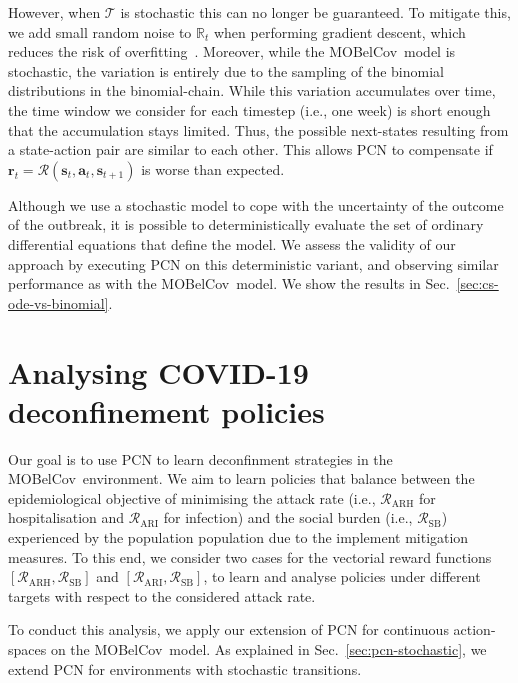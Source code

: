 \documentclass{article}
\renewcommand{\cite}[1]{\citep{#1}}
\newcommand{\mdptransition}{\mathcal{T}}
\newcommand{\mdprewardfn}{\mathcal{R}}
\newcommand{\momdprewardfn}{\bm{\mathcal{R}}}
\newcommand{\mdpstate}{\mathbf{s}}
\newcommand{\momdpreward}{\mathbf{r}}
\newcommand{\mdpaction}{\mathbf{a}}
\newcommand{\momdpname}{MOBelCov}
\begin{document}
However, when $\mdptransition$ is stochastic this can no longer be guaranteed. To mitigate this, we add small random noise to $\mathbb{R}_t$ when performing gradient descent, which reduces the risk of overfitting~\cite{zur2009noise}. Moreover, while the \momdpname\ model is stochastic, the variation is entirely due to the sampling of the binomial distributions in the binomial-chain. While this variation accumulates over time, the time window we consider for each timestep (i.e., one week) is short enough that the accumulation stays limited. Thus, the possible next-states resulting from a state-action pair are similar to each other. This allows PCN to compensate if $\momdpreward_t = \momdprewardfn(\mdpstate_t, \mdpaction_t, \mdpstate_{t+1})$ is worse than expected.

Although we use a stochastic model to cope with the uncertainty of the outcome of the outbreak, it is possible to deterministically evaluate the set of ordinary differential equations that define the model. We assess the validity of our approach by executing PCN on this deterministic variant, and observing similar performance as with the \momdpname\ model. We show the results in Sec.~\ref{sec:cs-ode-vs-binomial}.

\section{Analysing COVID-19 deconfinement policies}
\label{sec:experiments}
Our goal is to use PCN to learn deconfinment strategies in the \momdpname\ environment. We aim to learn policies that balance between the epidemiological objective of minimising the attack rate (i.e., $\mdprewardfn_\text{ARH}$ for hospitalisation and $\mdprewardfn_\text{ARI}$ for infection) and the social burden (i.e., $\mdprewardfn_\text{SB}$) experienced by the population population due to the implement mitigation measures. To this end, we consider two cases for the vectorial reward functions $[\mdprewardfn_\text{ARH}, \mdprewardfn_\text{SB}]$ and $[\mdprewardfn_\text{ARI}, \mdprewardfn_\text{SB}]$, to learn and analyse policies under different targets with respect to the considered attack rate.

To conduct this analysis, we apply our extension of PCN for continuous action-spaces on the \momdpname\ model. As explained in Sec.~\ref{sec:pcn-stochastic}, we extend PCN for environments with stochastic transitions.
\end{document}
